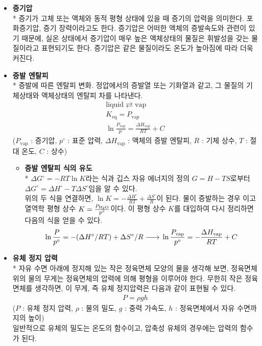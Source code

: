 \documentclass{GSHS-chemexp}
\begin{document}
	\begin{itemize}
		\item {\bf 증기압} \\*
		증기가 고체 또는 액체와 동적 평형 상태에 있을 때 증기의 압력을 의미한다. 포화증기압, 증기 장력이라고도 한다. 증기압은 어떠한 액체의 증발속도와 관련이 있기 때문에, 실온 상태에서 증기압이 매우 높은 액체상태의 물질은 휘발성을 갖는 물질이라고 표현되기도 한다. 증기압은 같은 물질이라도 온도가 높아짐에 따라 더욱 커진다.
		\item {\bf 증발 엔탈피} \\*
		증발에 따른 엔탈피 변화. 정압에서의 증발열 또는 기화열과 같고, 그 물질의 기체상태와 액체상태의 엔탈피 차를 나타낸다.
		\begin{gather*}
			\mathrm{liquid} \rightleftarrows \mathrm{vap} \\
			K_{\mathrm{eq}} = P_{\mathrm{vap}} \\
			\ln \frac{P_{\mathrm{vap}}}{p^{\circ}} = \frac{\Delta H_{\mathrm{vap}}}{RT} + C
		\end{gather*}
		($P_{\mathrm{vap}}$ : 증기압, $p^{\circ}$ : 표준 압력, $\Delta H_{\mathrm{vap}}$ : 액체의 증발 엔탈피, $R$ : 기체 상수, $T$ : 절대 온도, $C$ : 상수)
		\begin{itemize}
			\item {\bf 증발 엔탈피 식의 유도} \\*
			$\Delta G^{\circ} = -RT \ln K$라는 식과 깁스 자유 에너지의 정의 $G = H - TS$로부터 $\Delta G^{\circ} = \Delta H^{\circ} - T \Delta S^{\circ}$임을 알 수 있다. \\
			위의 두 식을 연결하면, $\ln K = -\frac{\Delta H^{\circ}}{RT} + \frac{\Delta S^{\circ}}{R}$이 된다.
			물이 증발하는 경우 이고 열역학 평형 상수 $K = \frac{P_{\ce{H_{2}O}}}{p^{\circ}}$이다. 이 평형 상수 $K$를 대입하여 다시 정리하면 다음의 식을 얻을 수 있다.
			\begin{gather*}
				\ln \frac{P}{p^{\circ}} = -(\Delta H^{\circ}/RT) + \Delta S^{\circ}/R \ce{->} \ln \frac{P_{\mathrm{vap}}}{p^{\circ}} = -\frac{\Delta H_{\mathrm{vap}}}{RT} + C
			\end{gather*}
		\end{itemize}
		
		\item {\bf 유체 정지 압력} \\*
		자유 수면 아래에 정지해 있는 작은 정육면체 모양의 물을 생각해 보면, 정육면체 위의 물의 무게는 정육면체의 압력에 의해 평형을 이루어야 한다. 무한히 작은 정육면체를 생각하면, 이 무게, 즉 유체 정지압력은 다음과 같이 표현될 수 있다.
		\begin{gather*}
			P = \rho gh
		\end{gather*}
		($P$ : 유체 정지 압력, $\rho$ : 물의 밀도, $g$ : 중력 가속도, $h$ : 정육면체에서 자유 수면까지의 높이) \\
		일반적으로 유체의 밀도는 온도의 함수이고, 압축성 유체의 경우에는 압력의 함수가 된다.
		
	\end{itemize}
	
\end{document}
